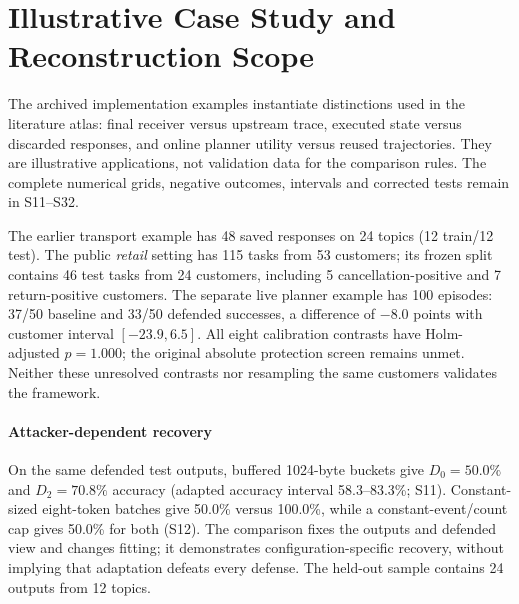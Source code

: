 \section{Illustrative Case Study and Reconstruction Scope}\label{app:case-study}\label{app:equivalence}
The archived implementation examples instantiate distinctions used in the literature atlas: final receiver versus upstream trace, executed state versus discarded responses, and online planner utility versus reused trajectories. They are illustrative applications, not validation data for the comparison rules. The complete numerical grids, negative outcomes, intervals and corrected tests remain in S11--S32.

The earlier transport example has 48 saved responses on 24 topics (12 train/12 test). The public \emph{retail} setting has 115 tasks from 53 customers; its frozen split contains 46 test tasks from 24 customers, including 5 cancellation-positive and 7 return-positive customers. The separate live planner example has 100 episodes: 37/50 baseline and 33/50 defended successes, a difference of $-8.0$ points with customer interval $[-23.9,6.5]$. All eight calibration contrasts have Holm-adjusted $p=1.000$; the original absolute protection screen remains unmet. Neither these unresolved contrasts nor resampling the same customers validates the framework.

\paragraph{Attacker-dependent recovery} On the same defended test outputs, buffered 1024-byte buckets give $D_0=50.0\%$ and $D_2=70.8\%$ accuracy (adapted accuracy interval 58.3--83.3\%; S11). Constant-sized eight-token batches give 50.0\% versus 100.0\%, while a constant-event/count cap gives 50.0\% for both (S12). The comparison fixes the outputs and defended view and changes fitting; it demonstrates configuration-specific recovery, without implying that adaptation defeats every defense. The held-out sample contains 24 outputs from 12 topics.


